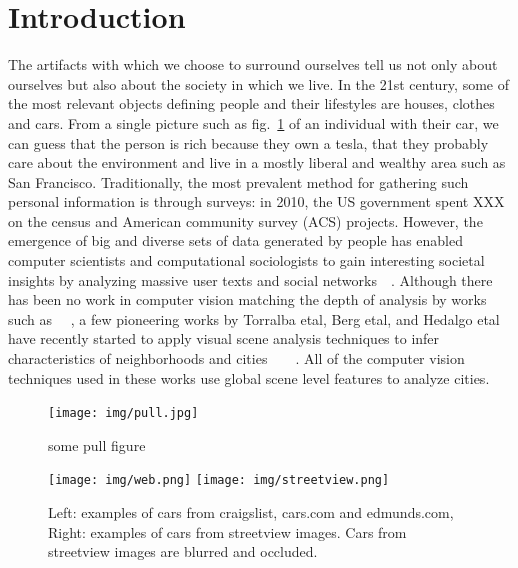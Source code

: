 \documentclass[10pt,twocolumn,letterpaper]{article}
\begin{document}
\section{Introduction}
The artifacts with which we choose to surround ourselves tell us not only about ourselves but also about the society in which we live. In the 21st century, some of the most relevant objects defining people and their lifestyles are houses, clothes and cars. From a single picture such as fig.~\ref{fig:pull} of an individual with their car, we can guess that the person is rich because they own a tesla, that they probably care about the environment and live in a mostly liberal and wealthy area such as San Francisco. Traditionally, the most prevalent method for gathering such personal information is through surveys: in 2010, the US government spent XXX on the census and American community survey (ACS) projects. However, the emergence of big and diverse sets of data generated by people has enabled computer scientists and computational sociologists to gain interesting societal insights by analyzing massive user texts and social networks~\cite{jure}~\cite{nlp_people}. Although there has been no work in computer vision matching the depth of analysis by works such as ~\cite{jure}~\cite{nlp_people}, a few pioneering works by Torralba etal, Berg etal, and Hedalgo etal have recently started to apply visual scene analysis techniques to infer characteristics of neighborhoods and cities~\cite{antonio}~\cite{mcdonalds}~\cite{mit_cvpr}~\cite{tamara}. All of the computer vision techniques used in these works use global scene level features to analyze cities.

\begin{figure}[t]
\begin{center}
   \texttt{[image: img/pull.jpg]}
\end{center}
   \caption{some pull figure}
\label{fig:pull}
\end{figure}

\label{fig:dataset1}
\begin{figure}[t]
\begin{center}
   \texttt{[image: img/web.png]}
   \texttt{[image: img/streetview.png]}
\end{center}
   \caption{Left: examples of cars from craigslist, cars.com and edmunds.com, Right: examples of cars from streetview images. Cars from streetview images are blurred and occluded.}
\end{figure}
\end{document}
